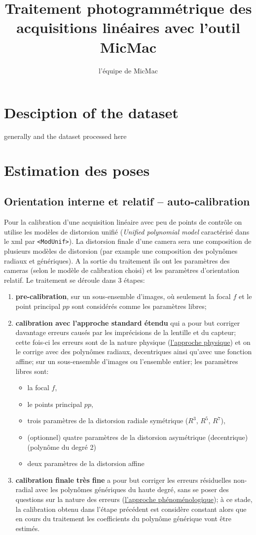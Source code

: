 \documentclass[11pt,a4paper,oneside]{book}
\author{l'équipe de MicMac}
\title{Traitement photogrammétrique des acquisitions linéaires avec l'outil MicMac}
\begin{document}
\maketitle
\tableofcontents
\chapter{Desciption of the dataset}
generally and the dataset processed here

\chapter{Estimation des poses}

\section{Orientation interne et relatif -- auto-calibration}
Pour la calibration d'une acquisition linéaire avec peu de points de contrôle on utilise les modèles de distorsion unifié (\textit{Unified polynomial model} caractérisé dans le xml par {\tt <ModUnif>}). 
La distorsion finale d'une camera sera une composition de plusieurs modèles de distorsion (par example une composition des polynômes radiaux et génériques). A la sortie du traitement ils ont les paramètres des cameras (selon le modèle de calibration choisi) et les paramètres d'orientation relatif. Le traitement se déroule dans 3 étapes:
%
\begin{enumerate}
\item \textbf{pre-calibration}, sur un sous-ensemble d'images, où seulement la focal $f$ et le point principal $pp$ sont considérés comme les paramètres libres;
\item \textbf{calibration avec l'approche standard étendu} qui a pour but corriger davantage erreurs causés par les imprécisions de la lentille et du capteur; cette fois-ci les erreurs sont {de la nature physique} (\underline{l’approche physique}) et on le corrige avec des polynômes radiaux, decentriques ainsi qu'avec une fonction affine; sur un sous-ensemble d'images ou l'ensemble entier; les paramètres libres sont:
	\begin{itemize}
	\item la focal $f$,
	\item le points principal $pp$,
	\item trois paramètres de la distorsion radiale symétrique ($R^3$, $R^5$, $R^7$),
	\item (optionnel) quatre paramètres de la distorsion asymétrique (decentrique) (polynôme du degré 2)
	\item deux paramètres de la distorsion affine 
	\end{itemize}
\item \textbf{calibration finale très fine} a pour but corriger les erreurs résiduelles non-radial avec les polynômes génériques du haute degré, sans se poser des questions sur la nature des erreurs (\underline{l’approche phénoménologique}); à ce stade, la calibration obtenu dans l'étape précédent est considère constant alors que en cours du traitement les coefficients du polynôme générique vont être estimés.
\end{enumerate}
\end{document}
